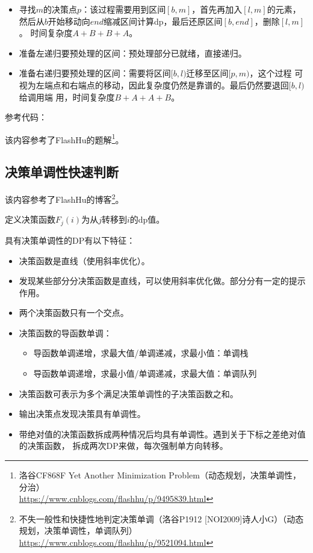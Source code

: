 \begin{itemize}
    \item 寻找$m$的决策点$p$：该过程需要用到区间$[b,m]$，首先再加入$[l,m]$的元素，
    然后从$b$开始移动向$end$缩减区间计算dp，最后还原区间$[b,end]$，删除$[l,m]$。
    时间复杂度$A+B+B+A$。
    \item 准备左递归要预处理的区间：预处理部分已就绪，直接递归。
    \item 准备右递归要预处理的区间：需要将区间$[b,l)$迁移至区间$[p,m)$，这个过程
    可视为左端点和右端点的移动，因此复杂度仍然是靠谱的。最后仍然要退回$[b,l)$给调用端
    用，时间复杂度$B+A+A+B$。
\end{itemize}

参考代码：


该内容参考了FlashHu的题解\footnote{
    洛谷CF868F Yet Another Minimization Problem（动态规划，决策单调性，分治）\\
    \url{https://www.cnblogs.com/flashhu/p/9495839.html}
}。
\subsection{决策单调性快速判断}
该内容参考了FlashHu的博客\footnote{
    不失一般性和快捷性地判定决策单调（洛谷P1912 [NOI2009]诗人小G）（动态规划，决策单调性，单调队列）\\
    \url{https://www.cnblogs.com/flashhu/p/9521094.html}
}。

定义决策函数$F_j(i)$为从$j$转移到$i$的dp值。

具有决策单调性的DP有以下特征：

\begin{itemize}
    \item 决策函数是直线（使用斜率优化）。
    \item 发现某些部分分决策函数是直线，可以使用斜率优化做。部分分有一定的提示作用。
    \item 两个决策函数只有一个交点。
    \item 决策函数的导函数单调：
    \begin{itemize}
        \item 导函数单调递增，求最大值/单调递减，求最小值：单调栈
        \item 导函数单调递增，求最小值/单调递减，求最大值：单调队列
    \end{itemize}
    \item 决策函数可表示为多个满足决策单调性的子决策函数之和。
    \item 输出决策点发现决策具有单调性。
    \item 带绝对值的决策函数拆成两种情况后均具有单调性。遇到关于下标之差绝对值的决策函数，
    拆成两次DP来做，每次强制单方向转移。
\end{itemize}
